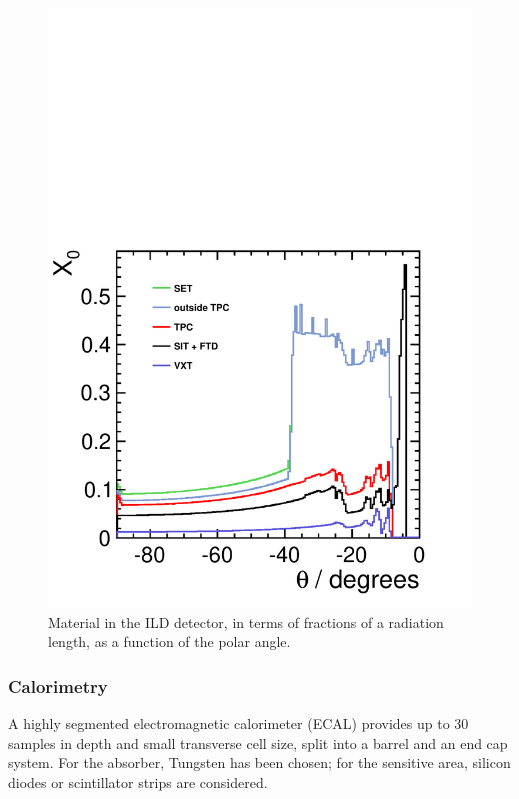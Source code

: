 \begin{figure}
\centering
\includegraphics[width=0.85\hsize,viewport={0 -10 600 500},clip]{chapters/figures/material-budget-new.pdf}
\caption{Material in the ILD detector, in terms of fractions of a radiation length, as a function of the polar angle.}
\label{fig:ILD_mat_budget}
\end{figure}

\subsubsection{Calorimetry}

A highly segmented electromagnetic calorimeter (ECAL) provides up to
30 samples in depth and small transverse cell size, split into a
barrel and an end cap system. For the absorber, Tungsten has been
chosen; for the sensitive area, silicon diodes 
or scintillator strips are considered.

